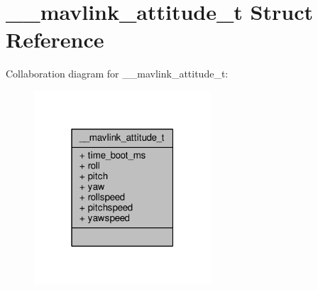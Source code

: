 \hypertarget{struct____mavlink__attitude__t}{\section{\+\_\+\+\_\+mavlink\+\_\+attitude\+\_\+t Struct Reference}
\label{struct____mavlink__attitude__t}
}


Collaboration diagram for \+\_\+\+\_\+mavlink\+\_\+attitude\+\_\+t\+:
\nopagebreak
\begin{figure}[H]
\begin{center}
\leavevmode
\includegraphics[width=187pt]{struct____mavlink__attitude__t__coll__graph}
\end{center}
\end{figure}
